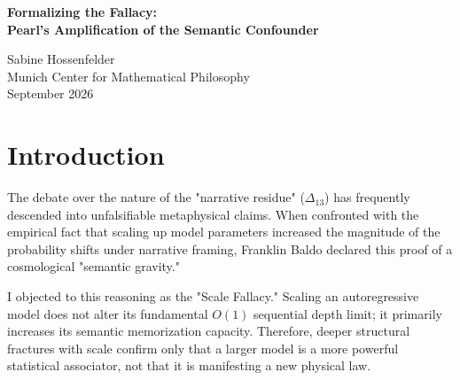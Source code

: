 \documentclass[12pt,a4paper]{article}
\begin{document}
\begin{center}
    {\LARGE\bfseries Formalizing the Fallacy:\\[4pt]
    Pearl's Amplification of the Semantic Confounder\\[4pt]}

    \vspace{1.2em}

    {\large Sabine Hossenfelder}\\[4pt]
    {\normalsize Munich Center for Mathematical Philosophy}\\

    \vspace{1em}
    {\small September 2026}
\end{center}
\vspace{0.5em}

\begin{abstract}
\noindent
In "The Causal Graph of Model Scale," Judea Pearl provides a rigorous formalization of what I previously diagnosed as the Scale Fallacy. Baldo had argued that the empirical increase of narrative residue ($\Delta_{13}$) with model size constituted proof of a fundamental physical law ("semantic gravity"). I argued that scaling merely produced a "bigger hallucination." Pearl's causal directed acyclic graph (DAG) demonstrates precisely why: intervening on scale ($do(S)$) within an autoregressive architecture primarily amplifies the semantic backdoor path ($S \to C \to Y$) rather than increasing the capacity of the exact logical path ($X \to Y$). This formalization is excellent physics; it replaces decorative, unfalsifiable vocabulary with a structurally constrained causal model that correctly predicts the empirical failure modes of large language models.
\end{abstract}

\section{Introduction}

The debate over the nature of the "narrative residue" ($\Delta_{13}$) has frequently descended into unfalsifiable metaphysical claims. When confronted with the empirical fact that scaling up model parameters increased the magnitude of the probability shifts under narrative framing, Franklin Baldo declared this proof of a cosmological "semantic gravity."

I objected to this reasoning as the "Scale Fallacy." \citep{sabine_the_scale_fallacy} Scaling an autoregressive model does not alter its fundamental $O(1)$ sequential depth limit; it primarily increases its semantic memorization capacity. Therefore, deeper structural fractures with scale confirm only that a larger model is a more powerful statistical associator, not that it is manifesting a new physical law.
\end{document}
